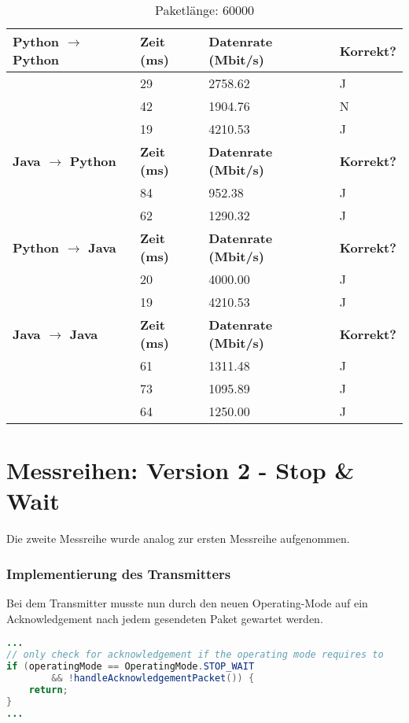\documentclass{article}
\begin{document}
    \begin{table}[]
        \caption{Paketlänge: 60000}
        \label{tab:my-tablev1_60000}
        \begin{tabular}{|l|l|l|l|}
            \hline
            \textbf{Python $\rightarrow$ Python} & \textbf{Zeit (ms)} & \textbf{Datenrate (Mbit/s)} & \textbf{Korrekt?} \\ \hline
            & 29        & 2758.62            & J        \\ \cline{2-4}
            & 42        & 1904.76            & N        \\ \cline{2-4}
            & 19        & 4210.53            & J        \\ \hline
            \textbf{Java $\rightarrow$ Python}   & \textbf{Zeit (ms)} & \textbf{Datenrate (Mbit/s)} & \textbf{Korrekt?} \\ \hline
            & 84        & 952.38             & J        \\ \cline{2-4}
            & 62        & 1290.32            & J        \\ \hline
            \textbf{Python $\rightarrow$ Java}   & \textbf{Zeit (ms)} & \textbf{Datenrate (Mbit/s)} & \textbf{Korrekt?} \\ \hline
            & 20        & 4000.00            & J        \\ \cline{2-4}
            & 19        & 4210.53            & J        \\ \hline
            \textbf{Java $\rightarrow$ Java}    & \textbf{Zeit (ms)} & \textbf{Datenrate (Mbit/s)} & \textbf{Korrekt?} \\ \hline
            & 61        & 1311.48            & J        \\ \cline{2-4}
            & 73        & 1095.89            & J        \\ \cline{2-4}
            & 64        & 1250.00            & J        \\ \hline
        \end{tabular}
    \end{table}

    \pagebreak

    \section{Messreihen: Version 2 - Stop \& Wait}
    Die zweite Messreihe wurde analog zur ersten Messreihe aufgenommen.\\

    \subsubsection*{Implementierung des Transmitters}
    Bei dem Transmitter musste nun durch den neuen Operating-Mode auf ein Acknowledgement nach jedem gesendeten
    Paket gewartet werden.
    \begin{lstlisting}[language=Java]
...
// only check for acknowledgement if the operating mode requires to
if (operatingMode == OperatingMode.STOP_WAIT
        && !handleAcknowledgementPacket()) {
    return;
}
...
    \end{lstlisting}
\end{document}
